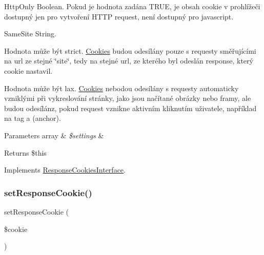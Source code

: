 \begin{DoxyItemize}
\item \textquotesingle{}Http\+Only\textquotesingle{} Boolean. Pokud je hodnota zadána T\+R\+UE, je obsah cookie v prohlížeči dostupný jen pro vytvoření H\+T\+TP request, není dostupný pro javascript. 
\item \textquotesingle{}Same\+Site\textquotesingle{} String. 
\begin{DoxyItemize}
\item Hodnota může být strict. \mbox{\hyperlink{namespace_pes_1_1_http_1_1_cookies}{Cookies}} budou odesílány pouze s requesty směřujícími na url ze stejné \char`\"{}site\char`\"{}, tedy na stejné url, ze kterého byl odeslán response, který cookie nastavil.  
\item Hodnota může být lax. \mbox{\hyperlink{namespace_pes_1_1_http_1_1_cookies}{Cookies}} nebodou odesílány s requesty automaticky vzniklými při vykreslování stránky, jako jsou načítané obrázky nebo framy, ale budou odesílánz, pokud request vznikne aktivním kliknutím uživatele, například na tag a (anchor).
\end{DoxyItemize}
\end{DoxyItemize}
\begin{DoxyParams}[1]{Parameters}
array & {\em \$settings} & \\
\hline
\end{DoxyParams}
\begin{DoxyReturn}{Returns}
\$this 
\end{DoxyReturn}


Implements \mbox{\hyperlink{interface_pes_1_1_http_1_1_cookies_1_1_response_cookies_interface_a462328426f473092af4994841a3bb3de}{Response\+Cookies\+Interface}}.

\mbox{\label{class_pes_1_1_http_1_1_cookies_1_1_response_cookies_a3eb38fba7bb5b61b9a0e4b4887168ff7}} 
\subsubsection{\texorpdfstring{set\+Response\+Cookie()}{setResponseCookie()}}
{\footnotesize\ttfamily set\+Response\+Cookie (\begin{DoxyParamCaption}\item[{\mbox{\hyperlink{interface_pes_1_1_http_1_1_cookies_1_1_response_cookie_interface}{Response\+Cookie\+Interface}}}]{\$cookie }\end{DoxyParamCaption})}

